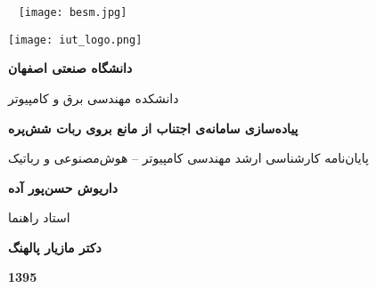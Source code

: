 

\thispagestyle{empty}
\mbox{}
\pagebreak

\thispagestyle{empty}
\begin{center}
	~\vfill
	\texttt{[image: besm.jpg]}
	~\vfill
\end{center}
\pagebreak

\thispagestyle{empty}
\begin{center}
\texttt{[image: iut\_logo.png]}
\vspace{0.4cm}

\textbf{دانشگاه صنعتی اصفهان}\\
\vspace{0.4cm}

{\large

	دانشکده مهندسی برق و کامپیوتر
}
\vspace{3.5cm}

{\Large
	\textbf{پیاده‌سازی سامانه‌ی اجتناب از مانع بروی ربات شش‌پره}\\
}
\vspace{3.5cm}

{\Large
	پایان‌نامه کارشناسی ارشد مهندسی کامپیوتر -- هوش‌مصنوعی و رباتیک\\
}
\vspace{1cm}

{\large
	\textbf{داریوش حسن‌پور آده}\\
}
\vspace{3.5cm}

{\large
	استاد راهنما\\
}
\vspace{0.5cm}

{\large
	\textbf{دکتر مازیار پالهنگ}\\
}
\vspace{4cm}

\textbf{1395}

\end{center}
\restoregeometry
\pagebreak

